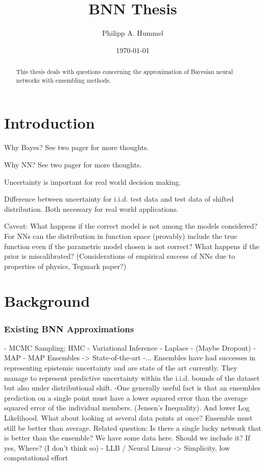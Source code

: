 \documentclass[12pt, A4, twoside]{report}
\title{BNN Thesis}
\author{Philipp A. Hummel}
\date{\today}
\begin{document}
\begin{titlepage}
\maketitle
\end{titlepage}


\begin{abstract}
This thesis deals with questions concerning the approximation of Bayesian neural networks with ensembling methods.
\end{abstract}

\chapter{Introduction}
Why Bayes? See two pager for more thoughts.

Why NN? See two pager for more thoughts.
\tableofcontents

Uncertainty is important for real world decision making.

Difference between uncertainty for i.i.d. test data and test data of shifted distribution. Both necessary for real world applications.

Caveat: What happens if the correct model is not among the models considered? For NNs can the distribution in function space (provably) include the true function even if the parametric model chosen is not correct? What happens if the prior is miscalibrated? (Considerations of empirical success of NNs due to properties of physics, Tegmark paper?)


\chapter{Background}
\subsection{Existing BNN Approximations}
- MCMC Sampling; HMC 
- Variational Inference 
- Laplace
- (Maybe Dropout)
- MAP
- MAP Ensembles -> State-of-the-art
    -... Ensembles have had successes in representing epistemic uncertainty and are state of the art currently. They manage to represent predictive uncertainty within the i.i.d. bounds of the dataset but also under distributional shift.
    -One generally useful fact is that an ensembles prediction on a single point must have a lower squared error than the average squared error of the individual members. (Jensen's Inequality). And lower Log Likelihood.
    What about looking at several data points at once? Ensemble must still be better than average.
    Related question: Is there a single lucky network that is better than the ensemble? 
    We have some data here. Should we include it? If yes, Where? (I don't think so)
- LLB / Neural Linear -> Simplicity, low computational effort
\end{document}
